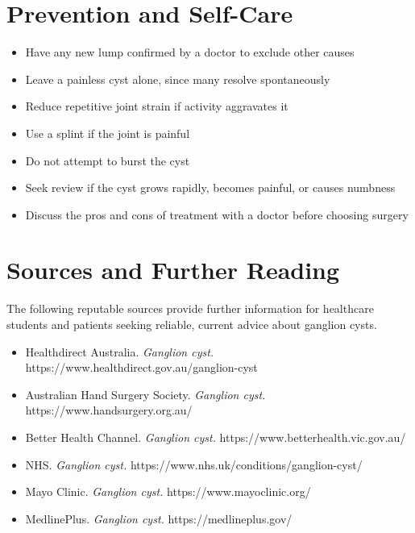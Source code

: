 \section*{Prevention and Self-Care}
\begin{itemize}
    \item Have any new lump confirmed by a doctor to exclude other causes
    \item Leave a painless cyst alone, since many resolve spontaneously
    \item Reduce repetitive joint strain if activity aggravates it
    \item Use a splint if the joint is painful
    \item Do not attempt to burst the cyst
    \item Seek review if the cyst grows rapidly, becomes painful, or causes numbness
    \item Discuss the pros and cons of treatment with a doctor before choosing surgery
\end{itemize}

\section*{Sources and Further Reading}
The following reputable sources provide further information for healthcare students and patients seeking reliable, current advice about ganglion cysts.
\begin{itemize}
    \item Healthdirect Australia. \textit{Ganglion cyst.} https://www.healthdirect.gov.au/ganglion-cyst
    \item Australian Hand Surgery Society. \textit{Ganglion cyst.} https://www.handsurgery.org.au/
    \item Better Health Channel. \textit{Ganglion cyst.} https://www.betterhealth.vic.gov.au/
    \item NHS. \textit{Ganglion cyst.} https://www.nhs.uk/conditions/ganglion-cyst/
    \item Mayo Clinic. \textit{Ganglion cyst.} https://www.mayoclinic.org/
    \item MedlinePlus. \textit{Ganglion cyst.} https://medlineplus.gov/
\end{itemize}
